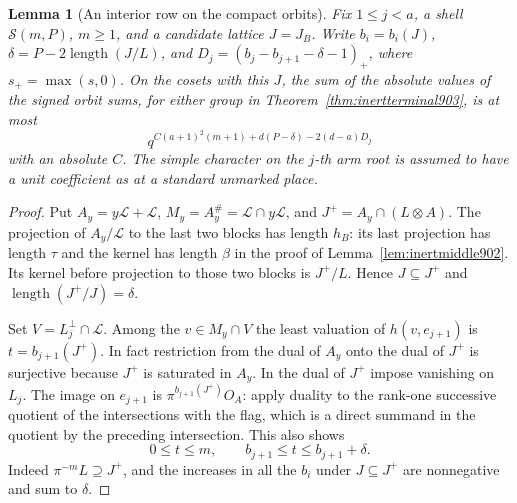 \documentclass[a4paper,11pt]{article}
\newtheorem{lemma}[proposition]{Lemma}
\theoremstyle{definition}
\theoremstyle{remark}
\numberwithin{equation}{section}
\begin{document}
\begin{lemma}[An interior row on the compact orbits]
\leavevmode\label{lem:inertdrop904}
Fix \(1\le j<a\), a shell \(\mathcal S(m,P)\), \(m\ge1\),
and a candidate lattice \(J=J_B\). Write \(b_i=b_i(J)\),
\(\delta=P-2\operatorname{length}(J/L)\), and
\(D_j=(b_j-b_{j+1}-\delta-1)_+\), where \(s_+=\max(s,0)\).
On the cosets with this \(J\), the sum of the absolute values
of the signed orbit sums, for either group in
Theorem~\ref{thm:inertterminal903}, is at most
\[
              q^{C(a+1)^2(m+1)+d(P-\delta)-2(d-a)D_j}
\]
with an absolute \(C\). The simple character on the \(j\)-th
arm root is assumed to have a unit coefficient as at a standard
unmarked place.
\end{lemma}
\begin{proof}
Put \(A_y=y\mathcal L+\mathcal L\),
\(M_y=A_y^\#=\mathcal L\cap y\mathcal L\), and
\(J^+=A_y\cap (L\otimes A)\). The projection of
\(A_y/\mathcal L\) to the last two blocks has length \(h_B\):
its last projection has length \(\tau\) and the kernel has
length \(\beta\) in the proof of Lemma~\ref{lem:inertmiddle902}.
Its kernel before projection to those two blocks is \(J^+/L\).
Hence \(J\subseteq J^+\) and \(\operatorname{length}(J^+/J)=\delta\).

Set \(V=L_j^\perp\cap\mathcal L\).
Among the \(v\in M_y\cap V\) the least valuation of \(h(v,e_{j+1})\)
is \(t=b_{j+1}(J^+)\). In fact restriction from the dual of
\(A_y\) onto the dual of \(J^+\) is surjective because \(J^+\)
is saturated in \(A_y\). In the dual of \(J^+\) impose vanishing
on \(L_j\). The image on \(e_{j+1}\) is \(\pi^{b_{j+1}(J^+)}O_A\):
apply duality to the rank-one successive quotient of the
intersections with the flag, which is a direct summand in the
quotient by the preceding intersection. This also shows
\[
       0\le t\le m,\qquad b_{j+1}\le t\le b_{j+1}+\delta .
\]
Indeed \(\pi^{-m}L\supseteq J^+\), and the increases in all
the \(b_i\) under \(J\subseteq J^+\) are nonnegative and sum
to \(\delta\).


\end{proof}
\end{document}
